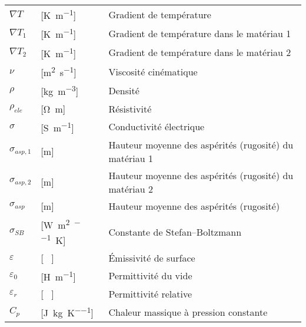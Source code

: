 \begin{longtable}{l p{2.5cm} p{4in}}
	$\nabla T$       & [\si{\kelvin\per\metre}]                            & Gradient de température                                      \\
	$\nabla T_1$     & [\si{\kelvin\per\metre}]                            & Gradient de température dans le matériau 1                   \\
	$\nabla T_2$     & [\si{\kelvin\per\metre}]                            & Gradient de température dans le matériau 2                   \\
	$\nu$            & [\si{\square\metre\per\second}]                     & Viscosité cinématique                                        \\
	$\rho$           & [\si{\kilogram\per\cubic\metre}]                    & Densité                                                      \\
	$\rho_{ele}$     & [\si{\ohm\metre}]                                   & Résistivité                                                  \\
	$\sigma$         & [\si{\siemens\per\metre}]                           & Conductivité électrique                                      \\
	$\sigma_{asp,1}$ & [\si{\metre}]                                       & Hauteur moyenne des aspérités (rugosité) du matériau 1       \\
	$\sigma_{asp,2}$ & [\si{\metre}]                                       & Hauteur moyenne des aspérités (rugosité) du matériau 2       \\
	$\sigma_{asp}$   & [\si{\metre}]                                       & Hauteur moyenne des aspérités (rugosité)                     \\
	$\sigma_{SB}$    & [\si{\watt\per\square\metre\per\raiseto{4}\kelvin}] & Constante de Stefan–Boltzmann                                \\
	$\varepsilon$    & [ \ ]                                               & Émissivité de surface                                        \\
	$\varepsilon_0$  & [\si{\henry\per\metre}]                             & Permittivité du vide                                         \\
	$\varepsilon_r$  & [ \ ]                                               & Permittivité relative                                        \\
	$C_p$            & [\si{\joule\per\kilogram\per\kelvin}]               & Chaleur massique à pression constante                        \\

\end{longtable}
